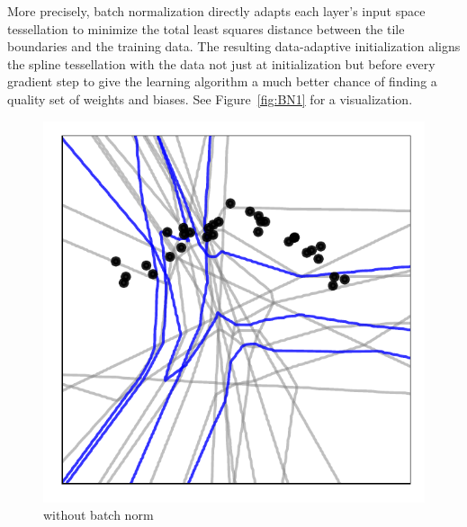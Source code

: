 \documentclass{notices}
\begin{document}
More precisely, batch normalization directly adapts each layer's input space tessellation to minimize the total least squares distance between the tile boundaries and the training data.
The resulting data-adaptive initialization aligns the spline tessellation with the data not just at initialization but before every gradient step to give the learning algorithm a much better chance of finding a quality set of weights and biases.
See Figure~\ref{fig:BN1} for a visualization.



\begin{figure}[h]
    \centering  
    \begin{minipage}{0.49\linewidth}
    \centering
\includegraphics[width=\linewidth]{Figs/2d_partition_before_3_2.pdf}\\[0em]
{\small\sf without batch norm}
\end{minipage}
\begin{minipage}{0.49\linewidth}
    \centering

\end{minipage}
\end{figure}
\end{document}
